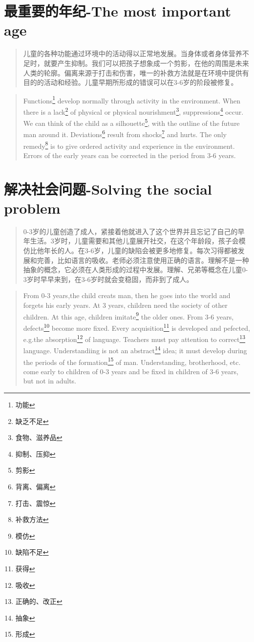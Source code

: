 \documentclass[lang=cn,10pt]{elegantbook}
\begin{document}
\chapter{最重要的年纪-The most important age}

\begin{quote}
{\small 儿童的各种功能通过环境中的活动得以正常地发展。当身体或者身体营养不足时，就要产生抑制。我们可以把孩子想象成一个剪影，在他的周围是未来人类的轮廓。偏离来源于打击和伤害，唯一的补救方法就是在环境中提供有目的的活动和经验。儿童早期所形成的错误可以在3-6岁的阶段被修复。}
\end{quote}

\begin{tcolorbox}
\begin{quote}
{\small Functions\footnote{功能} develop normally through activity in the environment. When there is a lack\footnote{缺乏不足} of physical or physical nourishment\footnote{食物、滋养品}, suppressions\footnote{抑制、压抑} occur. We can think of the child as a silhouette\footnote{剪影}, with the outline of the future man around it. Deviations\footnote{背离、偏离} result from shocks\footnote{打击、震惊} and hurts. The only remedy\footnote{补救方法} is to give ordered activity and experience in the environment. Errors of the early years can be corrected in the period from 3-6 years.}
\end{quote}
\end{tcolorbox}


\chapter{解决社会问题-Solving the social problem}

\begin{quote}
{\small 0-3岁的儿童创造了成人，紧接着他就进入了这个世界并且忘记了自己的早年生活。3岁时，儿童需要和其他儿童展开社交，在这个年龄段，孩子会模仿比他年长的人。在3-6岁，儿童的缺陷会被更多地修复。每次习得都被发展和完善，比如语言的吸收。老师必须注意使用正确的语言。理解不是一种抽象的概念，它必须在人类形成的过程中发展。理解、兄弟等概念在儿童0-3岁时早早来到，在3-6岁时就会变稳固，而非到了成人。}
\end{quote}

\begin{tcolorbox}
\begin{quote}
{\small From 0-3 years,the child creats man, then he goes into the world and forgets his early years. At 3 years, children need the society of other children. At this age, children imitate\footnote{模仿} the older ones. From 3-6 years, defects\footnote{缺陷不足} become more fixed. Every acquisition\footnote{获得} is developed and pefected, e.g.the absorption\footnote{吸收} of language. Teachers must pay attention to correct\footnote{正确的、改正} language. Understandiing is not an abstract\footnote{抽象} idea; it must develop during the periods of the formation\footnote{形成} of man. Understanding, brotherhood, etc. come early to children of 0-3 years and be fixed in children of 3-6 years, but not in adults.}
\end{quote}
\end{tcolorbox}
 
\end{document}
